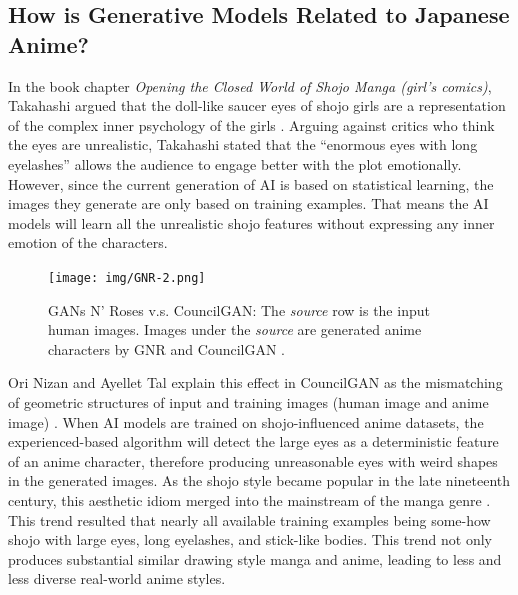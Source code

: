 \subsection*{How is Generative Models Related to Japanese Anime?}

In the book chapter {\it Opening the Closed World of Shojo Manga (girl's comics)},
Takahashi argued that the doll-like saucer eyes of shojo girls are a representation
of the complex inner psychology of the girls \cite{takahashi2008shojo}.
Arguing against critics who think the eyes are unrealistic,
Takahashi stated that the ``enormous eyes with long eyelashes''
allows the audience to engage better with the plot emotionally.
However, since the current generation of AI is based on statistical learning,
the images they generate are only based on training examples.
That means the AI models will learn all the unrealistic shojo features
without expressing any inner emotion of the characters.
\begin{figure}[h]
    \texttt{[image: img/GNR-2.png]}
    \caption{
        GANs N' Roses v.s. CouncilGAN: The {\it source} row is the input human images.
        Images under the {\it source} are generated anime characters by GNR and CouncilGAN
        \cite{chong2021gans}.
    }
\end{figure}

Ori Nizan and Ayellet Tal explain this effect in CouncilGAN as
the mismatching of geometric structures of input and training images (human image and anime image) \cite{nizan2020council}.
When AI models are trained on shojo-influenced anime datasets,
the experienced-based algorithm will detect the large eyes as a deterministic feature
of an anime character,
therefore producing unreasonable eyes with weird shapes in the generated images.
As the shojo style became popular in the late nineteenth century,
this aesthetic idiom merged into the mainstream of the manga genre \cite{takahashi2008shojo}.
This trend resulted that nearly all available training examples being some-how shojo with large eyes, long eyelashes, and stick-like bodies.
This trend not only produces substantial similar drawing style manga and anime,
leading to less and less diverse real-world anime styles.

